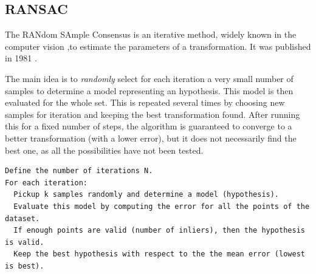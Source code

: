 \subsection{RANSAC}
\label{sub:ransac}

The RANdom SAmple Consensus is an iterative method, widely known in the computer vision ,to estimate the parameters of a transformation. It was published in 1981 \cite{FischlerB81}.

The main idea is to \emph{randomly} select for each iteration a very small number of samples to determine a model representing an hypothesis. This model is then evaluated for the whole set. This is repeated several times by choosing new samples for iteration and keeping the best transformation found. After running this for a fixed number of steps, the algorithm is guaranteed to converge to a better transformation (with a lower error), but it does not necessarily find the best one, as all the possibilities have not been tested. 

\begin{verbatim}
Define the number of iterations N.
For each iteration:
  Pickup k samples randomly and determine a model (hypothesis).
  Evaluate this model by computing the error for all the points of the dataset.
  If enough points are valid (number of inliers), then the hypothesis is valid.
  Keep the best hypothesis with respect to the the mean error (lowest is best).
\end{verbatim}

